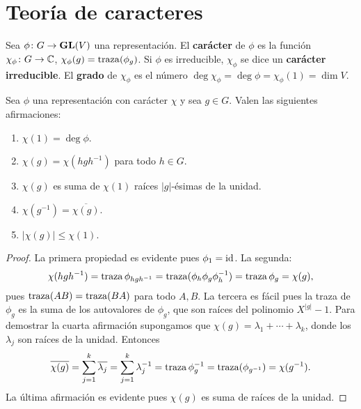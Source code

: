 \chapter{Teoría de caracteres}

\begin{definition}
  Sea $\phi\colon G\to\mathbf{GL}(V)$ una representación. El \textbf{carácter} de
  $\phi$ es la función $\chi_\phi\colon G\to\mathbb{C}$, $\chi_\phi(g)=\operatorname{traza}(\phi_g)$.
  Si $\phi$ es irreducible, $\chi_\phi$ se dice un \textbf{carácter
  irreducible}. El \textbf{grado} de $\chi_{\phi}$ es el número
  $\deg\chi_\phi=\deg\phi=\chi_{\phi}(1)=\dim V$. 
\end{definition}

\begin{proposition}
  \label{pro:chi(1)}
  Sea $\phi$ una representación con carácter $\chi$ y sea $g\in G$.
  Valen las siguientes afirmaciones:
  \begin{enumerate}
    \item $\chi(1)=\deg\phi$. 
    \item $\chi(g)=\chi(hgh^{-1})$ para todo $h\in G$.
    \item $\chi(g)$ es suma de $\chi(1)$ raíces $|g|$-ésimas de la unidad.
    \item $\chi(g^{-1})=\overline{\chi(g)}$.
    \item $|\chi(g)|\leq\chi(1)$.
  \end{enumerate}
\end{proposition}

\begin{proof}
  La primera propiedad es evidente pues $\phi_1=\operatorname{id}$. La segunda:
  \begin{align*}
    \chi(hgh^{-1})=\operatorname{traza}\phi_{hgh^{-1}}=\operatorname{traza}(\phi_h\phi_g\phi_h^{-1})=\operatorname{traza}\phi_g=\chi(g),
  \end{align*}
  pues $\operatorname{traza}(AB)=\operatorname{traza}(BA)$ para todo $A,B$. La tercera es fácil pues
  la traza de $\phi_g$ es la suma de los autovalores de $\phi_g$, que son
  raíces del polinomio $X^{|g|}-1$. Para demostrar la cuarta afirmación
  supongamos que $\chi(g)=\lambda_1+\cdots+\lambda_k$, donde los $\lambda_j$
  son raíces de la unidad. Entonces 
  \[
    \overline{\chi(g)}
    =\sum_{j=1}^k\overline{\lambda_j}=\sum_{j=1}^k\lambda_j^{-1}=\operatorname{traza}\phi_{g}^{-1}=\operatorname{traza}(\phi_{g^{-1}})=\chi(g^{-1}).
  \]
  La última afirmación es evidente pues $\chi(g)$ es suma de raíces de la
  unidad.
\end{proof}


